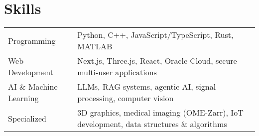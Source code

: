 \documentclass[a4paper,12pt]{article}
\begin{document}
\section{Skills}
\begin{tabularx}{\linewidth}{@{}l X@{}}
Programming &  \normalsize{Python, C++, JavaScript/TypeScript, Rust, MATLAB}\\
Web Development &  \normalsize{Next.js, Three.js, React, Oracle Cloud, secure multi-user applications}\\
AI \& Machine Learning &  \normalsize{LLMs, RAG systems, agentic AI, signal processing, computer vision}\\
Specialized &  \normalsize{3D graphics, medical imaging (OME-Zarr), IoT development, data structures \& algorithms}\\
\end{tabularx}

\vfill
{}
\end{document}
